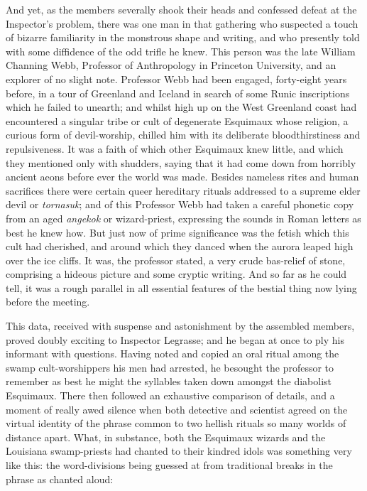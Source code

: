 \begin{pages}
\begin{Leftside}
And yet, as the members severally shook their heads and confessed defeat
at the Inspector's problem, there was one man in that gathering who
suspected a touch of bizarre familiarity in the monstrous shape and
writing, and who presently told with some diffidence of the odd trifle
he knew. This person was the late William Channing Webb, Professor of
Anthropology in Princeton University, and an explorer of no slight note.
Professor Webb had been engaged, forty-eight years before, in a tour of
Greenland and Iceland in search of some Runic inscriptions which he
failed to unearth; and whilst high up on the West Greenland coast had
encountered a singular tribe or cult of degenerate Esquimaux whose
religion, a curious form of devil-worship, chilled him with its
deliberate bloodthirstiness and repulsiveness. It was a faith of which
other Esquimaux knew little, and which they mentioned only with
shudders, saying that it had come down from horribly ancient aeons
before ever the world was made. Besides nameless rites and human
sacrifices there were certain queer hereditary rituals addressed to a
supreme elder devil or \emph{tornasuk}; and of this Professor Webb had taken a
careful phonetic copy from an aged \emph{angekok} or wizard-priest, expressing
the sounds in Roman letters as best he knew how. But just now of prime
significance was the fetish which this cult had cherished, and around
which they danced when the aurora leaped high over the ice cliffs. It
was, the professor stated, a very crude bas-relief of stone, comprising
a hideous picture and some cryptic writing. And so far as he could tell,
it was a rough parallel in all essential features of the bestial thing
now lying before the meeting.

This data, received with suspense and astonishment by the assembled
members, proved doubly exciting to Inspector Legrasse; and he began at
once to ply his informant with questions. Having noted and copied an
oral ritual among the swamp cult-worshippers his men had arrested, he
besought the professor to remember as best he might the syllables taken
down amongst the diabolist Esquimaux. There then followed an exhaustive
comparison of details, and a moment of really awed silence when both
detective and scientist agreed on the virtual identity of the phrase
common to two hellish rituals so many worlds of distance apart. What, in
substance, both the Esquimaux wizards and the Louisiana swamp-priests
had chanted to their kindred idols was something very like this: the
word-divisions being guessed at from traditional breaks in the phrase as
chanted aloud:


\end{Leftside}
\end{pages}
